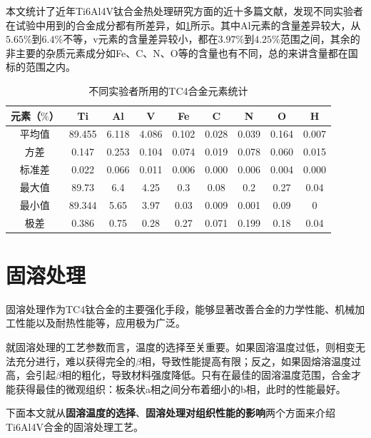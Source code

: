 \documentclass[
class = book,
zihao = -4,
font = noto,
paper = a4paper,
openany
]{easybook}
\newcommand{\ti}{Ti6Al4V}
\begin{document}
本文统计了近年\ti 钛合金热处理研究方面的近十多篇文献，发现不同实验者在试验中用到的合金成分都有所差异，如\ref{sec:mytc4ave}所示。其中Al元素的含量差异较大，从$ 5.65\% $到$ 6.4\% $不等，v元素的含量差异较小，都在$ 3.97 \%$到$ 4.25\% $范围之间，其余的非主要的杂质元素成分如Fe、C、N、O等的含量也有不同，总的来讲含量都在国标的范围之内。
\begin{table}[htbp]
	\centering
	\caption{不同实验者所用的TC4合金元素统计}
	\label{sec:mytc4ave}
	\begin{tabular}{ccccccccc}
		\toprule
元素（$ \% $）& Ti  & Al & V &Fe &C& N& O &H \\ \midrule
平均值 & 89.455 & 6.118 & 4.086 & 0.102 & 0.028 & 0.039 & 0.164 & 0.007 \\
方差 & 0.147 & 0.253 & 0.104 & 0.074 & 0.019 & 0.078 & 0.060 & 0.015 \\
标准差 & 0.022 & 0.066 & 0.011 & 0.006 & 0.000 & 0.006 & 0.004 & 0.000 \\
最大值 & 89.73 & 6.4 & 4.25 & 0.3 & 0.08 & 0.2 & 0.27 & 0.04 \\
最小值 & 89.344 & 5.65 & 3.97 & 0.03 & 0.009 & 0.001 & 0.09 & 0 \\
极差 & 0.386 & 0.75 & 0.28 & 0.27 & 0.071 & 0.199 & 0.18 & 0.04 \\
		\bottomrule
	\end{tabular}
\end{table}




\chapter{固溶处理}
固溶处理作为TC4钛合金的主要强化手段，能够显著改善合金的力学性能、机械加工性能以及耐热性能等，应用极为广泛。

就固溶处理的工艺参数而言，温度的选择至关重要。如果固溶温度过低，则相变无法充分进行，难以获得完全的$\beta$相，导致性能提高有限；反之，如果固熔溶温度过高，会引起$ \beta $相的粗化，导致材料强度降低。只有在最佳的固溶温度范围，合金才能获得最佳的微观组织：板条状a相之间分布着细小的b相，此时的性能最好。

下面本文就从\textbf{固溶温度的选择}、\textbf{固溶处理对组织性能的影响}两个方面来介绍\ti 合金的固溶处理工艺。
\end{document}
